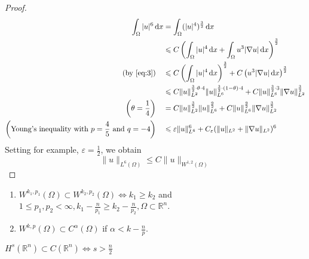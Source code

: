 \documentclass{report}
\begin{document}
\begin{proof}
    \begin{align*}
        \int_{\Omega} \vert u \vert^{6} \,\mathrm{d}x &= \int_{\Omega} (\vert u \vert^{4})^{\frac{3}{2}} \,\mathrm{d}x \\
        &\leq C \left(\int_{\Omega} \vert u \vert^{4} \,\mathrm{d}x + \int_{\Omega} u^{3}|\nabla u| \,\mathrm{d}x \right)^{\frac{3}{2}} \\
        (\text{by \eqref{eq:3}}) \quad &\leq C \left(\int_{\Omega} \vert u \vert^{4} \,\mathrm{d}x\right)^{\frac{3}{2}} + C \left(u^{3}|\nabla u| \,\mathrm{d}x \right)^{\frac{3}{2}} \\
        &\leq C \|u\|^{\frac{3}{2}\cdot \theta \cdot 4}_{L^{2}} \|u\|^{\frac{3}{2}\cdot (1-\theta) \cdot 4}_{L^{6}} + C \|u\|^{\frac{3}{2}\cdot 3}_{L^{6}} \|\nabla u\|^{\frac{3}{2}}_{L^{2}} \\
        \left(\theta = \frac{1}{4}\right) \quad &= C \|u\|^{\frac{3}{2}}_{L^{2}} \|u\|^{\frac{9}{2}}_{L^{6}} + C\|u\|^{\frac{9}{2}}_{L^{6}} \|\nabla u\|^{\frac{3}{2}}_{L^{2}} \\
        \left(\text{Young's inequality with } p=\frac{4}{5} \text{ and }q=-4\right) \quad &\leq \varepsilon \|u\|^{6}_{L^{6}} + C_{\varepsilon}(\|u\|_{L^{2}} + \|\nabla u\|_{L^{2}})^{6}
    \end{align*}
    Setting for example, \(\varepsilon = \frac{1}{2}\), we obtain
    \[\|u\|_{L^{6}(\Omega)} \leq C \|u\|_{W^{1, 2}(\Omega)}\]
\end{proof}

{
    \begin{enumerate}[label=\bfseries\tiny\protect\circled{\small\arabic*}]
		\item \(W^{k_1, p_1}(\Omega) \subset W^{k_2, p_2}(\Omega) \Longleftrightarrow k_1 \geq k_2\) and \(1 \leq p_1, p_2 < \infty, k_1 - \frac{n}{p_1} \geq k_2 - \frac{n}{p_2}, \Omega \subset \mathbb{R}^{n}\).
		\item \(W^{k,p}(\Omega) \subset C^{\alpha}(\Omega)\) if \(\alpha < k - \frac{n}{p}\).
	\end{enumerate}
}

\ex{}
{
    \(H^{s}(\mathbb{R}^{n}) \subset C(\mathbb{R}^{n}) \iff s > \frac{n}{2} \) 
}
\end{document}
